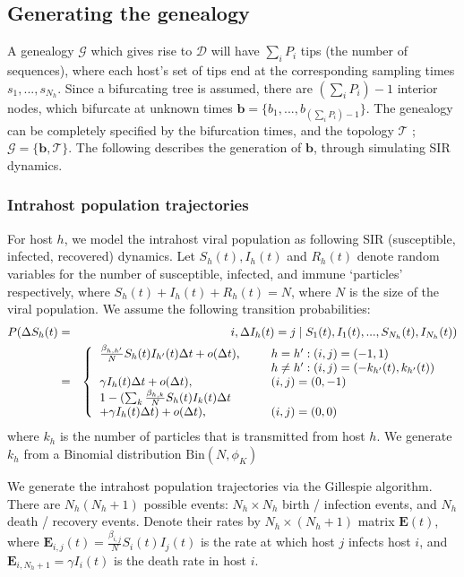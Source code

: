 \documentclass[]{report}
\begin{document}
\subsection{Generating the genealogy}
A genealogy $\mathcal{G}$ which gives rise to $\mathcal{D}$ will have $\sum_i P_i$ tips (the number of sequences), where each host's set of tips end at the corresponding sampling times $s_1,...,s_{N_h}$. Since a bifurcating tree is assumed, there are $(\sum_i P_i)-1$ interior nodes, which bifurcate at unknown times $\mathbf{b}=\{b_1,...,b_{(\sum_i P_i)-1}\}$. The genealogy can be completely specified by the bifurcation times, and the topology $\mathcal{T}$ ; $\mathcal{G}=\{\mathbf{b}, \mathcal{T}\}$. The following describes the generation of $\mathbf{b}$, through simulating SIR dynamics.
\subsubsection{Intrahost population trajectories}
For host $h$, we model the intrahost viral population as following SIR (susceptible, infected, recovered) dynamics. Let $S_h(t), I_h(t)$ and $R_h(t)$ denote random variables for the 
number of susceptible, infected, and immune `particles' respectively, where $S_h(t) + I_h(t) + R_h(t) = N$, where $N$ is the size of the viral population. We assume the following transition probabilities:
\begin{eqnarray}
P(\Delta S_h(t) &=& i, \Delta I_h(t) = j \mid S_1(t), I_1(t),..., S_{N_h}(t), I_{N_h}(t)) \label{eq:sirprocess}\\
&=& \left\{\begin{tabular}{l l l}
$\frac{\beta_{h,h'}}{N}S_h(t)I_{h'}(t)\Delta t + o(\Delta t)$, \hspace{0.4cm} & $h= h' : (i,j)=(-1,1)$ &  \\ 
& $h \neq h' : (i,j)=(-k_{h'}(t),k_{h'}(t))$ & \\
$\gamma I_h(t) \Delta t + o(\Delta t)$, & $(i,j)=(0,-1)$ & \nonumber\\
$1 - (\sum_k \frac{\beta_{h,k}}{N}S_h(t)I_k(t)\Delta t $ &  &\\
$+ \gamma I_h(t) \Delta t) + o(\Delta t)$, & $(i,j)=(0,0)$ &
\end{tabular}\right.
\end{eqnarray}
where $k_h$ is the number of particles that is transmitted from host $h$. We generate $k_h$ from a Binomial distribution $\textrm{Bin}(N, \phi_K)$

We generate the intrahost population trajectories via the Gillespie algorithm. There are $N_h(N_h+1)$ possible events:
$N_h \times N_h$ birth / infection events, and  $N_h$ death / recovery events. Denote their rates by $N_h \times (N_h+1)$ matrix $\mathbf{E}(t)$,
where $\mathbf{E}_{i,j}(t)=\frac{\beta_{i,j}}{N}S_i(t)I_j(t)$ is the rate at which host $j$ infects host $i$, and $\mathbf{E}_{i,N_h+1} = \gamma I_i(t)$ is the death rate in host $i$.
\end{document}
